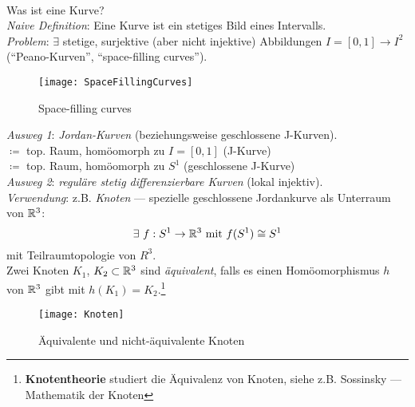 \begin{remark}\label{exkurs:kurve}
  \  \\
  \begin{minipage}{.45\textwidth}
    \vspace{0.1cm}
    Was ist eine Kurve? \\
    \emph{Naive Definition}: Eine Kurve ist ein stetiges Bild eines Intervalls. \\
    \emph{Problem}: \( \exists \) stetige, surjektive (aber nicht injektive) Abbildungen \( I = [0,1] \to I^2 \) (``Peano-Kurven'', ``space-filling curves'')\footnotemark.
    \vspace{0.1cm}
  \end{minipage}
  \hfill
  \begin{minipage}{.45\textwidth}
    \vspace{0.1cm}  
    \begin{figure}[H]
      \texttt{[image: SpaceFillingCurves]}
      \caption{Space-filling curves}
    \end{figure}
    \vspace{0.1cm}
  \end{minipage}
  \emph{Ausweg 1}: \emph{Jordan-Kurven} (beziehungsweise geschlossene J-Kurven). \\
    \( \coloneqq \) top. Raum, homöomorph zu \( I = [0,1] \) (J-Kurve) \\
    \( \coloneqq \) top. Raum, homöomorph zu \( S^1 \) (geschlossene J-Kurve) \\
  \emph{Ausweg 2}: \emph{reguläre stetig differenzierbare Kurven} (lokal injektiv). \\
  \emph{Verwendung}: z.B. \emph{Knoten} --- spezielle geschlossene Jordankurve als Unterraum von \( \mathbb{R}^3 \):
  \begin{equation*}
    \exists \ f : S^1 \to \mathbb{R}^3 \text{ mit } f(S^1) \cong S^1
  \end{equation*}
  mit Teilraumtopologie von \( R^3 \). \\
  Zwei Knoten \( K_1 \), \( K_2 \subset \mathbb{R}^3 \) sind \emph{äquivalent}, falls es einen Homöomorphismus \( h \) von \( \mathbb{R}^3 \) gibt mit \( h(K_1) = K_2 \).\footnote{\textbf{Knotentheorie} studiert die Äquivalenz von Knoten, siehe z.B. Sossinsky --- Mathematik der Knoten}
  \begin{figure}[H]
    \texttt{[image: Knoten]}
    \caption{Äquivalente und nicht-äquivalente Knoten}
  \end{figure}
\end{remark}

